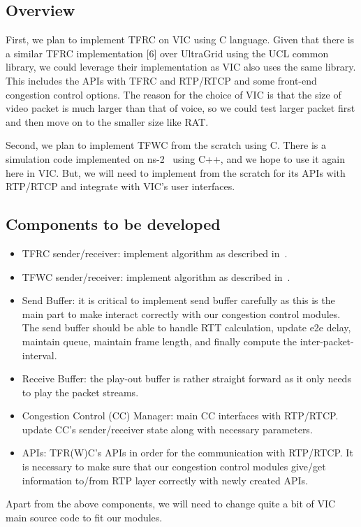 
\subsection{Overview}

First, we plan to implement TFRC on VIC using C language.  Given that there is a
similar TFRC implementation [6] over UltraGrid using the UCL common library, we
could leverage their implementation as VIC also uses the same library.  This
includes the APIs with TFRC and RTP/RTCP and some front-end congestion control
options. The reason for the choice of VIC is that the size of video packet is
much larger than that of voice, so we could test larger packet first and then
move on to the smaller size like RAT.

Second, we plan to implement TFWC from the scratch using C. There is a
simulation code implemented on ns-2~\cite{ns2} using C++, and we hope to use it
again here in VIC. But, we will need to implement from the scratch for its APIs
with RTP/RTCP and integrate with VIC's user interfaces.

\subsection{Components to be developed}

\begin{itemize}

\item TFRC sender/receiver: implement algorithm as described in~\cite{FHPW00}.

\item TFWC sender/receiver: implement algorithm as described in~\cite{SH06}.

\item Send Buffer: it is critical to implement send buffer carefully as
   this is the main part to make interact correctly with our congestion
   control modules. The send buffer should be able to handle RTT calculation,
   update e2e delay, maintain queue, maintain frame length, and finally compute
   the inter-packet-interval.

\item Receive Buffer: the play-out buffer is rather straight forward as it only
   needs to play the packet streams.

\item Congestion Control (CC) Manager: main CC interfaces with RTP/RTCP. update
   CC's sender/receiver state along with necessary parameters.

\item APIs: TFR(W)C's APIs in order for the communication with RTP/RTCP. It is
   necessary to make sure that our congestion control modules give/get
   information to/from RTP layer correctly with newly created APIs.

\end{itemize}

\vspace{-0.2in}
Apart from the above components, we will need to change quite a bit of VIC main
source code to fit our modules.
